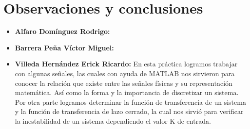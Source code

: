 \section{Observaciones y conclusiones}

\begin{itemize}
	\item \textbf{Alfaro Domínguez Rodrigo:}
	\item \textbf{Barrera Peña Víctor Miguel:} 
	\item \textbf{Villeda Hernández Erick Ricardo:}
	En esta práctica logramos trabajar con algunas señales, las cuales con ayuda de MATLAB nos sirvieron para conocer la relación que existe entre las señales físicas  y su representación matemática. Así como la forma y la importancia de discretizar un sistema. Por otra parte logramos determinar la función de transferencia de un sistema y la función de transferencia de lazo cerrado, la cual nos sirvió para verificar la inestabilidad de un sistema dependiendo el valor K de entrada.

	
\end{itemize}